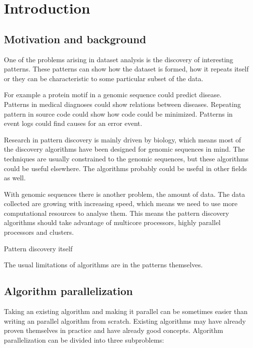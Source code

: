 \chapter{Introduction}
\label{c:introduction}

\section{Motivation and background}

One of the problems arising in dataset analysis is the discovery of interesting patterns. These patterns can show how the dataset is formed, how it repeats itself or they can be characteristic to some particular subset of the data.

For example a protein motif in a genomic sequence could predict disease. Patterns in medical diagnoses could show relations between diseases. Repeating pattern in source code could show how code could be minimized. Patterns in event logs could find causes for an error event.

Research in pattern discovery is mainly driven by biology, which means most of the discovery algorithms have been designed for genomic sequences in mind. The techniques are usually constrained to the genomic sequences, but these algorithms could be useful elsewhere. The algorithms probably could be useful in other fields as well.

With genomic sequences there is another problem, the amount of data\cite{HowIsGenomeDoing}. The data collected are growing with increasing speed, which means we need to use more computational resources to analyse them. This means the pattern discovery algorithms should take advantage of multicore processors, highly parallel processors and clusters.


Pattern discovery itself 



The usual limitations of algorithms are in the patterns themselves.




\section{Algorithm parallelization}

Taking an existing algorithm and making it parallel can be sometimes easier than writing an parallel algorithm from scratch. Existing algorithms may have already proven themselves in practice and have already good concepts. Algorithm parallelization can be divided into three subproblems:

